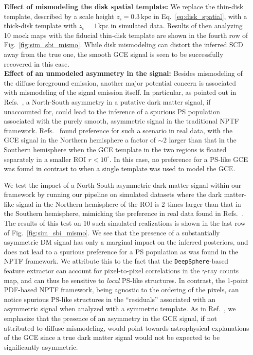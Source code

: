 \documentclass[prd,aps,10pt,nofootinbib,twocolumn,superscriptaddress,preprintnumbers,balancelastpage,longbibliography]{revtex4-1}
\begin{document}
\noindent
\textbf{Effect of mismodeling the disk spatial template:} 
We replace the thin-disk template, described by a scale height $z_\mathrm{s} = 0.3\,\mathrm{kpc}$ in Eq.~\eqref{eq:disk_spatial}, with a thick-disk template with $z_\mathrm{s} = 1\,\mathrm{kpc}$ in simulated data. Results of then analyzing 10 mock maps with the fiducial thin-disk template are shown in the fourth row of Fig.~\ref{fig:sim_sbi_mismo}. While disk mismodeling can distort the inferred SCD away from the true one, the smooth GCE signal is seen to be successfully recovered in this case. \\

\noindent
\textbf{Effect of an unmodeled asymmetry in the signal:}
Besides mismodeling of the diffuse foreground emission, another major potential concern is associated with mismodeling of the signal emission itself. In particular, as pointed out in Refs.~\cite{Leane:2020nmi,Leane:2020pfc}, a North-South asymmetry in a putative dark matter signal, if unaccounted for, could lead to the inference of a spurious PS population associated with the purely smooth, asymmetric signal in the traditional NPTF framework. Refs.~\cite{Leane:2020nmi,Leane:2020pfc} found preference for such a scenario in real \Fermi data, with the GCE signal in the Northern hemisphere a factor of $\sim2$ larger than that in the Southern hemisphere when the GCE template in the two regions is floated separately in a smaller ROI $r < 10^\circ$. In this case, no preference for a PS-like GCE was found in contrast to when a single template was used to model the GCE. 

We test the impact of a North-South-asymmetric dark matter signal within our framework by running our pipeline on simulated datasets where the dark matter-like signal in the Northern hemisphere of the ROI is 2 times larger than that in the Southern hemisphere, mimicking the preference in real data found in Refs.~\cite{Leane:2020nmi,Leane:2020pfc}. The results of this test on 10 such simulated realizations is shown in the last row of Fig.~\ref{fig:sim_sbi_mismo}. We see that the presence of a substantially asymmetric DM signal has only a marginal impact on the inferred posteriors, and does not lead to a spurious preference for a PS population as was found in the NPTF framework. We attribute this to the fact that the \texttt{DeepSphere}-based feature extractor can account for pixel-to-pixel correlations in the $\gamma$-ray counts map, and can thus be sensitive to \emph{local} PS-like structures. In contrast, the 1-point PDF-based NPTF framework, being agnostic to the ordering of the pixels, can notice spurious PS-like structures in the ``residuals'' associated with an asymmetric signal when analyzed with a symmetric template.
As in Ref.~\cite{Buschmann:2020adf}, we emphasize that the presence of an asymmetry in the GCE signal, if not attributed to diffuse mismodeling, would point towards astrophysical explanations of the GCE since a true dark matter signal would not be expected to be significantly asymmetric.
\end{document}

